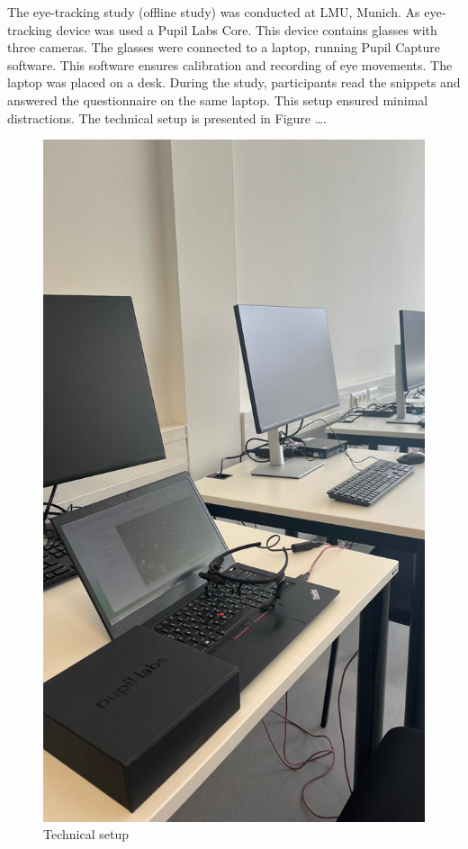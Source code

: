 The eye-tracking study (offline study) was conducted at LMU, Munich. As eye-tracking device was used a Pupil Labs Core. This device contains glasses with three cameras. The glasses were connected to a laptop, running Pupil Capture software. This software ensures calibration and recording of eye movements. The laptop was placed on a desk. During the study, participants read the snippets and answered the questionnaire on the same laptop. This setup ensured minimal distractions.  The technical setup is presented in Figure ….

\begin{figure} [H]
  \centering
  \includegraphics[scale=0.6]{figures/setup.png}
  \caption{Technical setup }
  \label{fig:AnhangsChor}
\end{figure}



